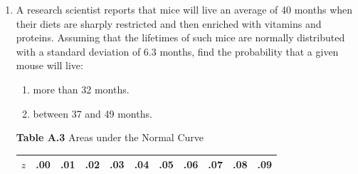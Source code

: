 \documentclass[12pt,a4paper]{article}
\newcommand{\yr}[1]{\hfill\textcolor{gray}{\small\textbf{[#1]}}}
\newcommand{\mk}[1]{\textcolor{orange!70!black}{\small\textbf{(#1 marks)}}}
\begin{document}
\begin{enumerate}
\mk{15} \yr{MATH 245 | L-2/T-1 | 2021--22}



\item A research scientist reports that mice will live an average of 40 months when their diets are sharply restricted and then enriched with vitamins and proteins. Assuming that the lifetimes of such mice are normally distributed with a standard deviation of $6.3$ months, find the probability that a given mouse will live:
\begin{enumerate}
  \item more than 32 months.
  \item between 37 and 49 months.
\end{enumerate}


\begin{center}
\end{center}

\vspace{0.3cm}
\noindent\textbf{Table A.3} Areas under the Normal Curve
\vspace{0.2cm}

\begin{center}
\small
\begin{longtable}{ccccccccccc}
\toprule\toprule
$z$ & .00 & .01 & .02 & .03 & .04 & .05 & .06 & .07 & .08 & .09 \\
\midrule
\endhead %


\end{longtable}
\end{center}
\end{enumerate}
\end{document}
